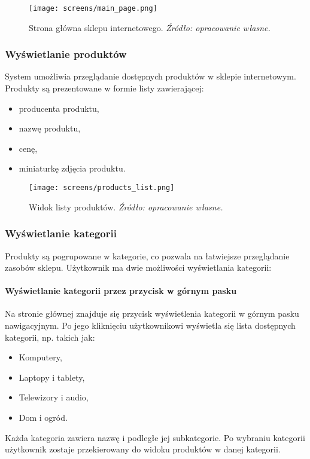 \documentclass[12pt,a4paper,oneside]{article}
\theoremstyle{definition}
\numberwithin{equation}{section}
\begin{document}
\begin{figure}[H]
    \centering
    \texttt{[image: screens/main\_page.png]}
    \caption{Strona główna sklepu internetowego. \emph{Źródło: opracowanie własne.}}
    \label{fig:home_page}
\end{figure}






\newpage
\subsubsection{Wyświetlanie produktów}
System umożliwia przeglądanie dostępnych produktów w sklepie internetowym. Produkty są prezentowane w formie listy zawierającej:
\begin{itemize}
    \item producenta produktu,
    \item nazwę produktu,
    \item cenę,
    \item miniaturkę zdjęcia produktu.
\end{itemize}

\begin{figure}[H]
    \centering
    \texttt{[image: screens/products\_list.png]}
    \caption{Widok listy produktów. \emph{Źródło: opracowanie własne.}}
    \label{fig:product_list}
\end{figure}






\subsubsection{Wyświetlanie kategorii}
Produkty są pogrupowane w kategorie, co pozwala na łatwiejsze przeglądanie zasobów sklepu. Użytkownik ma dwie możliwości wyświetlania kategorii:

\paragraph{Wyświetlanie kategorii przez przycisk w górnym pasku}
Na stronie głównej znajduje się przycisk wyświetlenia kategorii w górnym pasku nawigacyjnym. Po jego kliknięciu użytkownikowi wyświetla się lista dostępnych kategorii, np. takich jak:
\begin{itemize}
    \item Komputery,
    \item Laptopy i tablety,
    \item Telewizory i audio,
    \item Dom i ogród.
\end{itemize}
Każda kategoria zawiera nazwę i podległe jej subkategorie. Po wybraniu kategorii użytkownik zostaje przekierowany do widoku produktów w danej kategorii.
\end{document}

